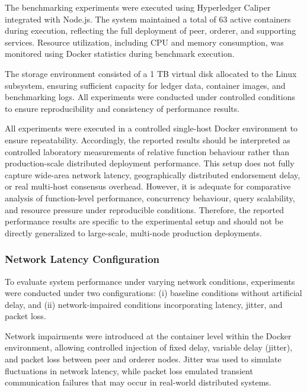 \documentclass[12pt]{article}
\begin{document}
	
	
	The benchmarking experiments were executed using Hyperledger Caliper integrated with Node.js. The system maintained a total of 63 active containers during execution, reflecting the full deployment of peer, orderer, and supporting services. Resource utilization, including CPU and memory consumption, was monitored using Docker statistics during benchmark execution.
	
	The storage environment consisted of a 1 TB virtual disk allocated to the Linux subsystem, ensuring sufficient capacity for ledger data, container images, and benchmarking logs. All experiments were conducted under controlled conditions to ensure reproducibility and consistency of performance results.
	
	
	
	All experiments were executed in a controlled single-host Docker environment to ensure repeatability. Accordingly, the reported results should be interpreted as controlled laboratory measurements of relative function behaviour rather than production-scale distributed deployment performance. This setup does not fully capture wide-area network latency, geographically distributed endorsement delay, or real multi-host consensus overhead. However, it is adequate for comparative analysis of function-level performance, concurrency behaviour, query scalability, and resource pressure under reproducible conditions. Therefore, the reported performance results are specific to the experimental setup and should not be directly generalized to large-scale, multi-node production deployments.
	
	\subsubsection{Network Latency Configuration}
	
	To evaluate system performance under varying network conditions, experiments were conducted under two configurations: (i) baseline conditions without artificial delay, and (ii) network-impaired conditions incorporating latency, jitter, and packet loss.
	
	Network impairments were introduced at the container level within the Docker environment, allowing controlled injection of fixed delay, variable delay (jitter), and packet loss between peer and orderer nodes. Jitter was used to simulate fluctuations in network latency, while packet loss emulated transient communication failures that may occur in real-world distributed systems.
	
\end{document}
